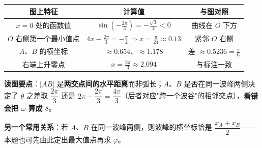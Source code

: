 \begin{answer}
\begin{center}
\begin{tabular}{ccc}
\toprule
图上特征 & 计算值 & 与图对照 \\
\midrule
$x=0$ 处的函数值 & $\sin\left(-\frac{2\pi}3\right)=-\frac{\sqrt3}2<0$ & 曲线在 $O$ 下方  \\
$O$ 右侧第一个最小值点 & $4x-\frac{2\pi}3=-\frac\pi2\Rightarrow x=\frac\pi{24}\approx0.13$ & 紧邻 $O$ 右侧  \\
$A$、$B$ 的横坐标 & $\approx0.654$、$\approx1.178$ & 差 $\approx0.5236=\frac\pi6$  \\
右端上升零点 & $x=\frac{2\pi}3\approx2.094$ & 与标注一致  \\
\bottomrule
\end{tabular}
\end{center}

\begin{gktip}
\textbf{读图要点}：$|AB|$ 是\textbf{两交点间的水平距离}而非弧长；$A$、$B$ 是否在同一波峰两侧决定了 $\theta$ 之差取 $\dfrac{2\pi}3$ 还是 $2\pi-\dfrac{2\pi}3=\dfrac{4\pi}3$（后者对应"跨一个波谷"的相邻交点），\textbf{看错会把 $\omega$ 算成 $8$}。

\textbf{另一个常用关系}：若 $A$、$B$ 在同一波峰两侧，则波峰的横坐标恰是 $\dfrac{x_A+x_B}2$——本题也可先由此定出最大值点再求 $\varphi$。
\end{gktip}


\par\medskip

\end{answer}

